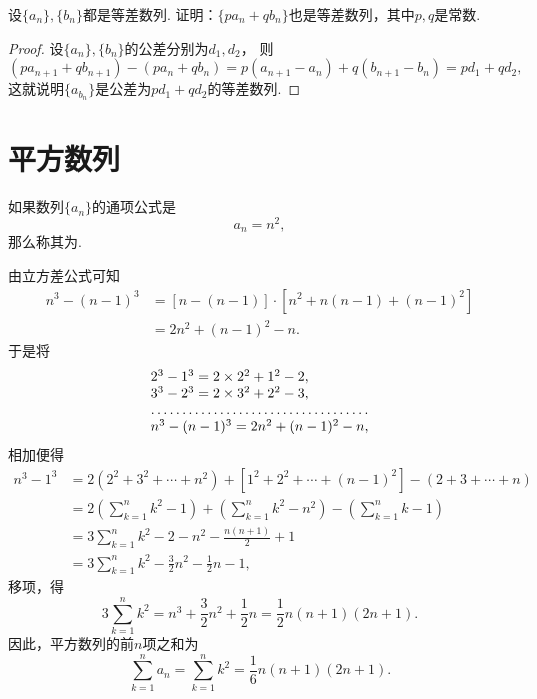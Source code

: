\begin{example}
设\(\{a_n\},\{b_n\}\)都是等差数列.
证明：\(\{p a_n + q b_n\}\)也是等差数列，其中\(p,q\)是常数.
\begin{proof}
设\(\{a_n\},\{b_n\}\)的公差分别为\(d_1,d_2\)，
则\begin{equation*}
	(p a_{n+1} + q b_{n+1})
	- (p a_n + q b_n)
	= p (a_{n+1} - a_n)
	+ q (b_{n+1} - b_n)
	= p d_1 + q d_2,
\end{equation*}
这就说明\(\{a_{b_n}\}\)是公差为\(p d_1 + q d_2\)的等差数列.
\end{proof}
\end{example}

\section{平方数列}
如果数列\(\{a_n\}\)的通项公式是\begin{equation*}
a_n = n^2,
\end{equation*}那么称其为.

由立方差公式可知
\begin{equation*}\begin{aligned}
n^3 - (n-1)^3
&= [n - (n-1)] \cdot [n^2 + n(n-1) + (n-1)^2] \\
&= 2n^2 + (n-1)^2 - n.
\end{aligned}\end{equation*}于是将\begin{equation*}
\begin{array}{l}
2^3 - 1^3 = 2\times2^2+1^2-2, \\
3^3 - 2^3 = 2\times3^2+2^2-3, \\
\hdotsfor{1} \\
n^3 - (n-1)^3 = 2n^2 + (n-1)^2 - n,
\end{array}
\end{equation*}相加便得\begin{equation*}\begin{aligned}
n^3 - 1^3
&= 2(2^2+3^2+\dotsb+n^2) + [1^2+2^2+\dotsb+(n-1)^2] - (2+3+\dotsb+n) \\
&= 2\left(\sum_{k=1}^n k^2 - 1\right)
    + \left(\sum_{k=1}^n k^2 - n^2\right)
    - \left(\sum_{k=1}^n k - 1\right) \\
&= 3\sum_{k=1}^n k^2 - 2 - n^2 - \frac{n(n+1)}{2} + 1 \\
&= 3\sum_{k=1}^n k^2 - \frac{3}{2} n^2 - \frac{1}{2} n - 1,
\end{aligned}\end{equation*}
移项，得\begin{equation*}
3 \sum_{k=1}^n k^2
= n^3 + \frac{3}{2} n^2 + \frac{1}{2} n
= \frac{1}{2} n (n+1) (2n+1).
\end{equation*}
因此，平方数列的前\(n\)项之和为
\begin{equation}
	\sum_{k=1}^n a_n
	= \sum_{k=1}^n k^2
	= \frac{1}{6} n(n+1)(2n+1).
\end{equation}

